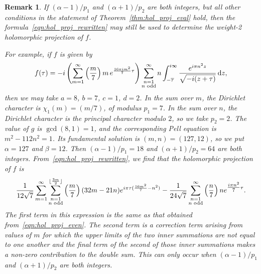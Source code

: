 \documentclass[11pt,reqno]{amsart}
\renewcommand{\=}{\;=\;}
\theoremstyle{myremark}
\newtheorem{remark}{Remark}
\newcommand{\dd}{\mathrm{d}}
\begin{document}
\begin{remark}
If $(\alpha-1)/p_1$ and $(\alpha+1)/p_2$ are both integers, but all other conditions in the statement of Theorem~\ref{thm:hol_proj_eval} hold, then the formula~\eqref{eqn:hol_proj_rewritten} may still be used to determine the weight-2 holomorphic projection of $f$.

For example, if $f$ is given by
\begin{equation} \label{eqn:hol_proj_example_for_conditions} 
f(\tau) = -i \left( \sum_{m=1}^\infty \left( {m \over 7} \right) m \, e^{{16\pi i m^2 \over 7} \tau} \right) \sum_{\substack{n=1 \\ n \text{ odd}}}^\infty n \int_{-\overline{\tau}}^{i \infty} {e^{{i\pi n^2}z} \over \sqrt{-i(z+\tau)}} \, \dd z,
\end{equation}
then we may take $a=8$, $b=7$, $c=1$, $d=2$. 
In the sum over $m$, the Dirichlet character is $\chi_1(m) = (m/7)$, of modulus $p_1=7$. 
In the sum over $n$, the Dirichlet character is the principal character modulo $2$, so we take $p_2=2$. 
The value of $g$ is $\gcd(8,1)=1$, and the corresponding Pell equation is $m^2-112n^2=1$. 
Its fundamental solution is $(m,n) = (127,12)$, so we put $\alpha=127$ and $\beta=12$. Then $(\alpha-1)/p_1 = 18$ and $(\alpha+1)/p_2 = 64$ are both integers. From~\eqref{eqn:hol_proj_rewritten}, we find that the holomorphic projection of $f$ is
\[ 
{1 \over 12\sqrt{7}} \sum_{m=1}^\infty \sum_{\substack{n=1 \\ n \text{ odd}}}^{\lfloor {3m \over 2} \rfloor} \left( {m \over 7} \right) (32m-21n) e^{i\pi\tau({16m^2 \over 7} - n^2)} - {1 \over 24\sqrt{7}} \sum_{\substack{n=1 \\ n \text{ odd}}}^\infty \left( {n \over 7} \right) n e^{\tfrac{i\pi n^2}{7}\tau }. 
\]
The first term in this expression is the same as that obtained from~\eqref{eqn:hol_proj_even}. 
The second term is a correction term arising from values of $m$ for which the upper limits of the two inner summations are not equal to one another and the final term of the second of those inner summations makes a non-zero contribution to the double sum. 
This can only occur when $(\alpha-1)/p_1$ and $(\alpha+1)/p_2$ are both integers.
\end{remark}
\end{document}
